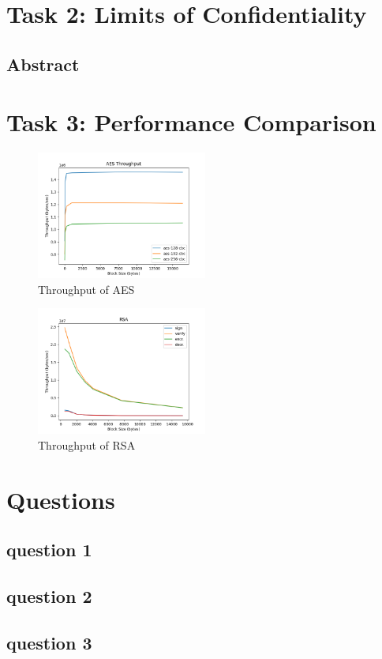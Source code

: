 \documentclass[11pt]{article}
\begin{document}
\section*{Task 2: Limits of Confidentiality}
\subsection*{Abstract}

\section*{Task 3: Performance Comparison}
\begin{figure}[!ht]
	\centering
	\includegraphics[width=0.5\textwidth]{./assets/aes.png}
	\caption{Throughput of AES}
	\label{fig:aes}
\end{figure}

\begin{figure}[!ht]
	\centering
	\includegraphics[width=0.5\textwidth]{./assets/rsa.png}
	\caption{Throughput of RSA}
	\label{fig:rsa}
\end{figure}

\section*{Questions}
\subsection*{question 1}
\subsection*{question 2}
\subsection*{question 3}
\end{document}
